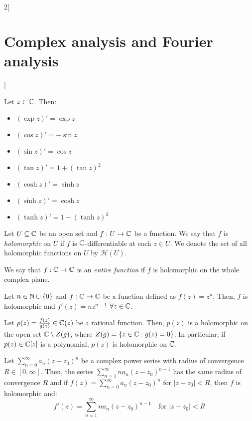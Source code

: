 \documentclass[../../../main.tex]{subfiles}
\begin{document}
\begin{multicols}{2}[\section{Complex analysis and Fourier analysis}]
\begin{theorem}
  \end{theorem}
  \begin{proposition}
    Let $z\in\mathbb{C}$. Then:
    \begin{itemize}
      \item ${\left(\exp{z}\right)}'=\exp{z}$
      \item ${\left(\cos{z}\right)}'=-\sin{z}$
      \item ${\left(\sin{z}\right)}'=\cos{z}$
      \item ${\left(\tan{z}\right)}'=1+{(\tan{z})}^2$
      \item ${\left(\cosh{z}\right)}'=\sinh{z}$
      \item ${\left(\sinh{z}\right)}'=\cosh{z}$
      \item ${\left(\tanh{z}\right)}'=1-{(\tanh{z})}^2$
    \end{itemize}
  \end{proposition}
  \begin{definition}
    Let $U\subseteq \mathbb{C}$ be an open set and $f:U\rightarrow \mathbb{C}$ be a function. We say that $f$ is \emph{holomorphic} on $U$ if $f$ is $\mathbb{C}$-differentiable at each $z\in U$. We denote the set of all holomorphic functions on $U$ by $\mathcal{H}(U)$.
  \end{definition}
  \begin{definition}
    We say that $f:\mathbb{C}\rightarrow\mathbb{C}$ is an \emph{entire function} if $f$ is holomorphic on the whole complex plane.
  \end{definition}
  \begin{proposition}
    Let $n\in\mathbb{N}\cup\{0\}$ and $f:\mathbb{C}\rightarrow\mathbb{C}$ be a function defined as  $f(z)=z^n$. Then, $f$ is holomorphic and $f'(z)=nz^{n-1}$ $\forall z\in\mathbb{C}$.
  \end{proposition}
  \begin{corollary}
    Let $p(z)=\frac{f(z)}{g(z)}\in\mathbb{C}(z)$ be a rational function. Then, $p(z)$ is a holomorphic on the open set $\mathbb{C}\setminus Z(g)$, where $Z(g)=\{z\in\mathbb{C}:g(z)=0\}$.
    In particular, if $p(z)\in\mathbb{C}[z]$ is a polynomial, $p(z)$ is holomorphic on $\mathbb{C}$.
  \end{corollary}
  \begin{theorem}
    Let $\sum_{n=0}^\infty a_n{(z-z_0)}^n$ be a complex power series with radius of convergence $R\in[0,\infty]$. Then, the series $\sum_{n=1}^\infty na_n{(z-z_0)}^{n-1}$ has the same radius of convergence $R$ and if $f(z)=\sum_{n=0}^\infty a_n{(z-z_0)}^n$ for $|z-z_0|<R$, then $f$ is holomorphic and: $$f'(z)=\sum_{n=1}^\infty na_n{(z-z_0)}^{n-1}\quad\text{for } |z-z_0|<R$$

\end{theorem}
\end{multicols}
\end{document}
